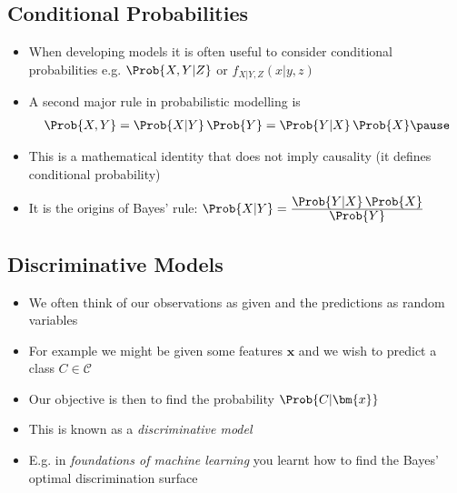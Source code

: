 
\begin{slide}
  \section{Conditional Probabilities}
  
\begin{PauseHighLight}
  \begin{itemize}
  \item When developing models it is often useful to consider
    conditional probabilities e.g.{} $\Prob{X,Y|Z}$ or
    $f_{X|Y,Z}(x|y,z)$\pause
  \item A second major rule in probabilistic modelling is
    \begin{align*}
      \Prob{X,Y} = \Prob{X|Y}\,\Prob{Y} = \Prob{Y|X}\,\Prob{X}\pause
    \end{align*}
  \item This is a mathematical identity that does not imply causality
    (it defines conditional probability)\pause
  \item It is the origins of Bayes' rule: $\Prob{X|Y} =
    \frac{\displaystyle \Prob{Y|X}\,\Prob{X}}{\displaystyle\Prob{Y}}$\pause
  \end{itemize}
\end{PauseHighLight}

\end{slide}




\begin{slide}
\section{Discriminative Models}

\begin{PauseHighLight}
  \begin{itemize}
  \item We often think of our observations as given and the predictions
    as random variables\pause
  \item For example we might be given some features $\bm{x}$ and we wish
    to predict a class $C\in\mathcal{C}$\pause
  \item Our objective is then to find the probability $\Prob{C|\bm{x}}$\pause
  \item This is known as a \emph{discriminative model}\pause
  \item E.g.{} in \textit{foundations of machine learning} you learnt how to
    find the Bayes' optimal discrimination surface\pause
  \end{itemize}
\end{PauseHighLight}

\end{slide}


